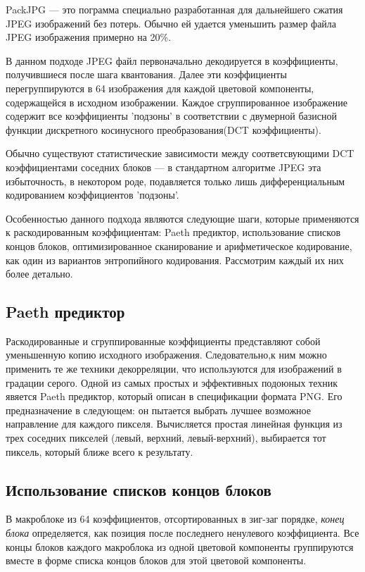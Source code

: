 \documentclass{matmex-diploma-custom}
\begin{document}
PackJPG --- это пограмма специально разработанная для дальнейшего сжатия JPEG изображений без потерь. Обычно ей удается уменьшить размер файла JPEG изображения  примерно на 20\%.

В данном подходе JPEG файл первоначально декодируется в коэффициенты, получившиеся после шага квантования.
Далее эти коэффициенты перегруппируются в 64 изображения для каждой цветовой компоненты, содержащейся в исходном изображении. Каждое сгруппированное изображение содержит все коэффициенты 'подзоны' в соответствии с  двумерной  базисной функции дискретного косинусного преобразования(DCT коэффициенты).

Обычно существуют статистические зависимости между соответсвующими DCT коэффициентами соседних блоков --- в стандартном алгоритме JPEG эта избыточность, в некотором роде, подавляется только лишь дифференциальным кодированием коэффициентов 'подзоны'.

Особенностью данного подхода являются следующие шаги, которые применяются к раскодированным коэффициентам:
Paeth предиктор, использование списков концов блоков, оптимизированное сканирование и арифметическое кодирование, как один из вариантов энтропийного кодирования. Рассмотрим каждый их них более детально.

\subsection{Paeth предиктор}

Раскодированные и сгруппированные коэффициенты представляют собой уменьшенную копию исходного изображения. Следовательно,к ним  можно применить те же техники декорреляции, что используются для изображений в градации серого.
Одной из самых простых и эффективных подоюных техник явяется Paeth предиктор, который описан в спецификации формата PNG. Его предназначение в следующем: он пытается выбрать лучшее возможное направление для каждого пикселя. Вычисляется простая линейная функция из трех соседних пикселей (левый, верхний, левый-верхний), выбирается тот пиксель, который ближе всего к результату.

\subsection{Использование списков концов блоков}
В макроблоке из 64 коэффициентов, отсортированных в зиг-заг порядке, \emph{конец блока} определяется, как позиция после последнего ненулевого коэффициента. Все концы блоков каждого макроблока из одной цветовой компоненты группируются вместе в форме списка концов блоков для этой цветовой компоненты.
\end{document}
